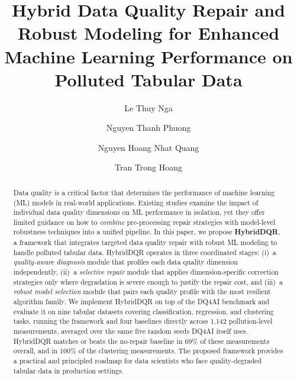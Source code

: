 \documentclass[runningheads]{llncs}
\begin{document}
\title{Hybrid Data Quality Repair and Robust Modeling for Enhanced Machine Learning Performance on Polluted Tabular Data}


\author{
  Le Thuy Nga \and
  Nguyen Thanh Phuong \and
  Nguyen Hoang Nhat Quang \and
  Tran Trong Hoang
}



\maketitle

\begin{abstract}
Data quality is a critical factor that determines the performance of
machine learning (ML) models in real-world applications.
Existing studies examine the impact of individual data quality
dimensions on ML performance in isolation, yet they offer limited
guidance on how to \emph{combine} pre-processing repair strategies
with model-level robustness techniques into a unified pipeline.
In this paper, we propose \textbf{HybridDQR}, a framework that
integrates targeted data quality repair with robust ML modeling
to handle polluted tabular data.
HybridDQR operates in three coordinated stages:
(i)~a \emph{quality-aware diagnosis} module that profiles each
data quality dimension independently,
(ii)~a \emph{selective repair} module that applies dimension-specific
correction strategies only where degradation is severe enough to
justify the repair cost, and
(iii)~a \emph{robust model selection} module that pairs each
quality profile with the most resilient algorithm family.
We implement HybridDQR on top of the DQ4AI benchmark and evaluate
it on nine tabular datasets covering classification, regression,
and clustering tasks, running the framework and four baselines
directly across 1,142 pollution-level measurements, averaged over
the same five random seeds DQ4AI itself uses.
HybridDQR matches or beats the no-repair baseline in 69\% of
these measurements overall, and in 100\% of the clustering
measurements.
The proposed framework provides a practical and principled
roadmap for data scientists who face quality-degraded tabular data
in production settings.

\end{abstract}
\end{document}
